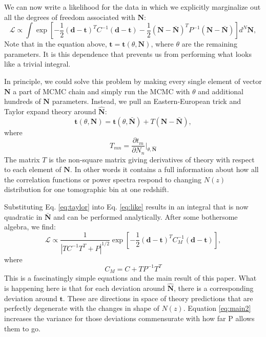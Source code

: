 \documentclass[a4paper,11pt]{article}
\newcommand{\vd}{\mathbf{d}}
\newcommand{\vt}{\mathbf{t}}
\newcommand{\vN}{\mathbf{N}}
\begin{document}
We can now write a likelihood for the data in which we explicitly marginalize out all the degrees of freedom associated with $\vN$:
\begin{equation}
\mathcal{L} \propto  \int \exp\left [-\frac{1}{2} (\vd-\vt)^T C^{-1} (\vd-\vt) -\frac{1}{2} (\vN - \bar{\vN})^T P^{-1} (\vN -\bar{\vN}) \right]  d^N\vN, \label{eq:like2}
  \end{equation}
  Note that in the equation above, $\vt=\vt(\theta,\vN)$, where $\theta$ are the remaining parameters. It is this dependence that prevents us from performing what looks like a trivial integral.

  In principle, we could solve this problem by making every single element of vector $\vN$ a part of MCMC chain and simply run the MCMC with $\theta$ and additional hundreds of $\vN$ parameters. Instead, we pull an Eastern-European trick and Taylor expand theory around $\hat{\vN}$:
  \begin{equation}
    \vt(\theta,\vN) = \vt(\theta,\bar{\vN}) + T \left(\vN - \bar{\vN} \right), \label{eq:taylor}
  \end{equation}
  where
  \begin{equation}
    T_{mn} = \frac{\partial t_m}{\partial N_n} \bigg|_{\theta,\hat{\vN}}
  \end{equation}
  The matrix $T$ is the non-square matrix giving derivatives of theory with respect to each element of $\vN$. In other words it contains a full information about how all the correlation functions or power spectra respond to changing $N(z)$ distribution for one tomographic bin at one redshift.

  Substituting Eq. \ref{eq:taylor} into Eq. \ref{eq:like} results in an integral that is now quadratic in $\bar{\vN}$ and can be performed analytically. After some bothersome algebra, we find:
  \begin{equation}
    \mathcal{L} \propto \frac{1}{|T C^{-1} T^T +P |^{1/2}} \exp\left [-\frac{1}{2} (\vd-\vt)^T C_M^{-1} (\vd-\vt) \right], \label{eq:main1}
  \end{equation}
  where
  \begin{equation}
    C_M = C + T P^{-1}T^T \label{eq:main2}
  \end{equation}
  This is a fascinatingly simple equations and the main result of this paper. What is happening here is that for each deviation around $\hat{\vN}$, there is a corresponding deviation around $\vt$. These are directions in  space of theory predictions that are perfectly degenerate with the changes in shape of $N(z)$.  Equation \ref{eq:main2}  increases the variance for those deviations commensurate with how far P allows them to go.
\end{document}
